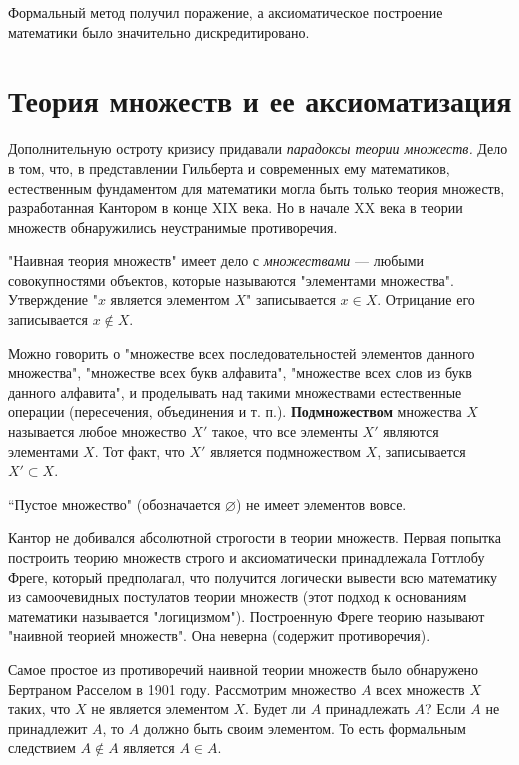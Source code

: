 \documentclass[12pt]{book}
\renewcommand{\emptyset}{\varnothing}
\theoremstyle{upshape}
\theoremstyle{generic}
\theoremstyle{upshapenonumber}
\newcommand{\следствие}{%
     \refstepcounter{teorema}
     {\noindent\bf Следствие \thechapter.\arabic{teorema}:\ }}
\newcommand{\пример}{%
     \refstepcounter{teorema}
     {\noindent\bf Пример \thechapter.\arabic{teorema}:\ }}
\newcommand{\лемма}{%
     \refstepcounter{teorema}
     {\noindent\bf Лемма \thechapter.\arabic{teorema}:\ }}
\newcommand{\теорема}{%
     \refstepcounter{teorema}
     {\noindent\bf Теорема \thechapter.\arabic{teorema}:\ }}
\newcommand{\утверждение}{%
     \refstepcounter{teorema}
     {\noindent\bf Утверждение \thechapter.\arabic{teorema}:\ }}
\begin{document}
Формальный метод получил поражение, а 
аксиоматическое построение математики
было значительно дискредитировано.


\section{Теория множеств и ее аксиоматизация}


Дополнительную остроту кризису придавали 
{\em парадоксы теории множеств.}
Дело в том, что, в представлении Гильберта
и современных ему математиков, естественным
фундаментом для математики могла быть только
теория множеств, разработанная Кантором в конце
XIX века. Но в начале XX века в теории множеств
обнаружились неустранимые противоречия. 

"Наивная теория множеств" имеет дело с 
{\em множествами} --- любыми совокупностями
объектов, которые называются "элементами множества". 
Утверждение "$x$ является элементом $X$" записывается
$x\in X$. Отрицание его записывается
$x\notin X$.

Можно говорить о "множестве всех последовательностей
элементов данного множества",
"множестве всех букв алфавита", "множестве
всех слов из букв данного алфавита", и проделывать над такими множествами
естественные операции (пересечения, объединения
и т. п.). {\bf Подмножеством} множества
$X$ называется любое множество $X'$ такое,
что все элементы $X'$ являются элементами
$X$. Тот факт, что $X'$ является подмножеством $X$,
записывается $X'\subset X$. 

``Пустое множество" (обозначается $\emptyset$) 
не имеет элементов вовсе. 

Кантор не добивался абсолютной строгости
в теории множеств. Первая попытка построить
теорию множеств строго и аксиоматически
принадлежала Готтлобу Фреге, который 
предполагал, что получится логически вывести всю математику
из самоочевидных постулатов теории множеств (этот подход
к основаниям математики называется "логицизмом"). 
Построенную Фреге теорию называют "наивной теорией 
множеств". Она неверна (содержит противоречия).

Самое простое из противоречий наивной
теории множеств было обнаружено
Бертраном Расселом в 1901 году. 
Рассмотрим множество $A$ всех множеств
$X$ таких, что $X$ не является элементом $X$.
Будет ли $A$ принадлежать $A$? 
Если $A$ не принадлежит $A$, то $A$ должно
быть своим элементом. То есть формальным следствием
$A\notin A$ является $A\in A$. 
\end{document}
